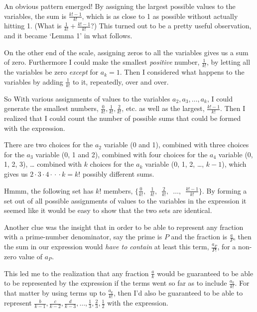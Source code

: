 \documentclass{article}
\begin{document}
An obvious pattern emerged!
By assigning the largest possible values to the variables,
the sum is \(\frac{k!-1}{k!}\),
which is as close to 1 as possible without actually
hitting 1. (What is \(\frac{1}{k!} + \frac{k!-1}{k!}\)?)
This turned out to be
a pretty useful observation, and it became `Lemma 1' in what follows.

On the other end of the scale, assigning zeros to all the variables 
gives us a sum of zero.
Furthermore
I could make
the smallest \emph{positive} number, \(\frac{1}{k!}\), by
letting all the variables be zero \emph{except} for \(a_k = 1\).
Then I considered what happens to the variables by
adding \(\frac{1}{k!}\) to it, repeatedly, over and over.

So With various assignments of values to
the variables \(a_2, a_3, \dots{}, a_k\), I could
generate the smallest numbers, \(\frac{0}{k!}, \frac{1}{k!}, \frac{2}{k!}\), etc.
as well as the largest,
\(\frac{k!-1}{k!}\).
Then I realized that I could count the number of possible sums that could be formed 
with the expression.

There are two choices for the \(a_2\) variable (0 and 1),
combined with three choices for the \(a_3\) variable (0, 1 and 2),
combined with four choices for the \(a_4\) variable (0, 1, 2, 3),
\dots{} combined with \(k\) choices for
the \(a_k\) variable (0, 1, 2, \dots{}, \(k\!-\!1\)), which
gives us \(2\cdot{}3\cdot{}4\cdot{}\cdot{}\cdot{}k = k!\) possibly different sums.

Hmmm, the following set has \(k!\) members,
\(\{\frac{0}{k!},\enspace \frac{1}{k!},\enspace \frac{2}{k!},
\enspace \dots{},\enspace \frac{k!-1}{k!}\}\).
By forming a set out of all possible assignments of values to the variables in the expression
it seemed like it would be easy to show that the two sets are identical.

Another clue was the insight that in order to be able to represent
any fraction with a prime-number denominator, say the prime is \(P\) and
the fraction is \(\frac{a}{P}\), then the sum in our
expression would \emph{have to contain} at least this term,
\(\frac{a_P}{P!}\),
for a non-zero value of \(a_P\).

This led me to the realization that any fraction \(\frac{a}{k}\)
would be guaranteed to be able to be represented by the expression
if the terms went so far as to include \(\frac{a_k}{k!}\). For that
matter by using terms up to \(\frac{a_k}{k!}\), then I'd
also be guaranteed to be able to represent \(\frac{b}{k-1},
\frac{c}{k-2},
\frac{d}{k-3}, \dots{},
\frac{1}{3},
\frac{2}{3},
\frac{1}{2}\) with the expression.
\end{document}
